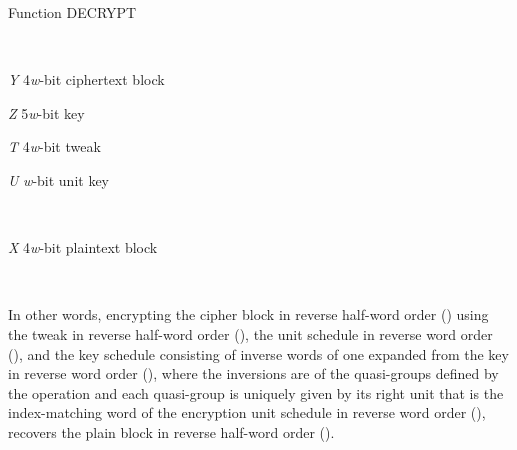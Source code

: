 \documentclass[a4paper,oneside,english]{amsart}
\numberwithin{equation}{section}
\numberwithin{figure}{section}
\newenvironment{lyxlist}[1]
{\begin{list}{}
{\settowidth{\labelwidth}{#1}
 \setlength{\leftmargin}{\labelwidth}
 \addtolength{\leftmargin}{\labelsep}
 \renewcommand{\makelabel}[1]{##1\hfil}}}
{\end{list}}
\begin{document}
\begin{algorithm}
\caption{\label{alg:Function-DECRYPT}Function DECRYPT}

\begin{description}
\item [{Input}]~

\begin{lyxlist}{00.00.0000}
\item [{\emph{Y}}] 4\emph{w}-bit ciphertext block
\item [{\emph{Z}}] 5\emph{w}-bit key
\item [{\emph{T}}] 4\emph{w}-bit tweak
\item [{\emph{U}}] \emph{w}-bit unit key
\end{lyxlist}
\item [{Output}]~

\begin{lyxlist}{00.00.0000}
\item [{\emph{X}}] 4\emph{w}-bit plaintext block
\end{lyxlist}
\item [{Relation}]~



\end{description}
\end{algorithm}





In other words, encrypting the cipher block in reverse half-word order
() using the tweak in reverse half-word order (),
the unit schedule in reverse word order (),
and the key schedule consisting of inverse words of one expanded from
the key in reverse word order (), where the inversions
are of the quasi-groups defined by the operation 
and each quasi-group is uniquely given by its right unit that is the
index-matching word of the encryption unit schedule in reverse word
order (), recovers the plain block in
reverse half-word order ().
\end{document}
